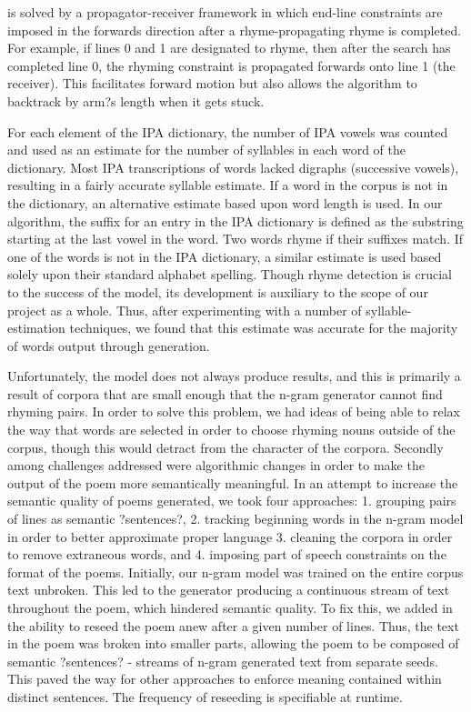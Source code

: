 \documentclass[10pt,twocolumn]{article}
\begin{document}
is solved by a propagator-receiver framework in which end-line constraints are imposed in the forwards direction after a rhyme-propagating rhyme is completed. For example, if lines 0 and 1 are designated to rhyme, then after the search has completed line 0, the rhyming constraint is propagated forwards onto line 1 (the receiver). This facilitates forward motion but also allows the algorithm to backtrack by arm?s length when it gets stuck.

For each element of the IPA dictionary, the number of IPA vowels was counted and used as an estimate for the number of syllables in each word of the dictionary. Most IPA transcriptions of words lacked digraphs (successive vowels), resulting in a fairly accurate syllable estimate. If a word in the corpus is not in the dictionary, an alternative estimate based upon word length is used. 
In our algorithm, the suffix for an entry in the IPA dictionary is defined as the substring starting at the last vowel in the word. Two words rhyme if their suffixes match. If one of the words is not in the IPA dictionary, a similar estimate is used based solely upon their standard alphabet spelling. Though rhyme detection is crucial to the success of the model, its development is auxiliary to the scope of our project as a whole. Thus, after experimenting with a number of syllable-estimation techniques, we found that this estimate was accurate for the majority of words output through generation.

Unfortunately, the model does not always produce results, and this is primarily a result of corpora that are small enough that the n-gram generator cannot find rhyming pairs. In order to solve this problem, we had ideas of being able to relax the way that words are selected in order to choose rhyming nouns outside of the corpus, though this would detract from the character of the corpora. 
Secondly among challenges addressed were algorithmic changes in order to make the output of the poem more semantically meaningful. In an attempt to increase the semantic quality of poems generated, we took four approaches: 1. grouping pairs of lines as semantic ?sentences?, 2. tracking beginning words in the n-gram model in order to better approximate proper language  3. cleaning the corpora in order to remove extraneous words, and 4. imposing part of speech constraints on the format of the poems.
Initially, our n-gram model was trained on the entire corpus text unbroken. This led to the generator producing a continuous stream of text throughout the poem, which hindered semantic quality. To fix this, we added in the ability to reseed the poem anew after a given number of lines. Thus, the text in the poem was broken into smaller parts, allowing the poem to be composed of semantic ?sentences? - streams of n-gram generated text from separate seeds. This paved the way for other approaches to enforce meaning contained within distinct sentences. The frequency of reseeding is specifiable at runtime. 
\end{document}
